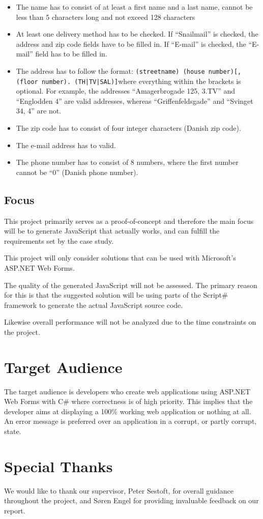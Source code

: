 		\begin{itemize}
			\item The name has to consist of at least a first name and a last name, cannot be less than 5 characters long and not exceed 128 characters
			\item At least one delivery method has to be checked. If ``Snailmail'' is checked, the address and zip code fields have to be filled in. If ``E-mail'' is checked, the ``E-mail'' field has to be filled in.
			\item The address has to follow the format: \newline\newline \texttt{(streetname) (house number)[, (floor number). (TH|TV|SAL)]}\newline\newline where everything within the brackets is optional. For example, the addresses ``Amagerbrogade 125, 3.TV'' and ``Englodden 4'' are valid addresses, whereas ``Griffenfeldsgade'' and ``Svinget 34, 4'' are not.
			\item The zip code has to consist of four integer characters (Danish zip code).
			\item The e-mail address has to valid.
			\item The phone number has to consist of 8 numbers, where the first number cannot be “0” (Danish phone number).
		\end{itemize}

	\subsection{Focus} %
	\label{sub:focus}
		This project primarily serves as a proof-of-concept and therefore the main focus will be to generate JavaScript that actually works, and can fulfill the requirements set by the case study. 

		This project will only consider solutions that can be used with Microsoft's ASP.NET Web Forms.

		The quality of the generated JavaScript will not be assessed. The primary reason for this is that the suggested solution will be using parts of the Script\# framework to generate the actual JavaScript source code.

		Likewise overall performance will not be analyzed due to the time constraints on the project.


\section{Target Audience} %
\label{sec:section_name}
	The target audience is developers who create web applications using ASP.NET Web Forms with C\# where correctness is of high priority. This implies that the developer aims at displaying a 100\% working web application or nothing at all. An error message is preferred over an application in a corrupt, or partly corrupt, state.

\section{Special Thanks} %
\label{sec:special_thanks}
We would like to thank our supervisor, Peter Sestoft, for overall guidance throughout the project, and S\o ren Engel for providing invaluable feedback on our report.






